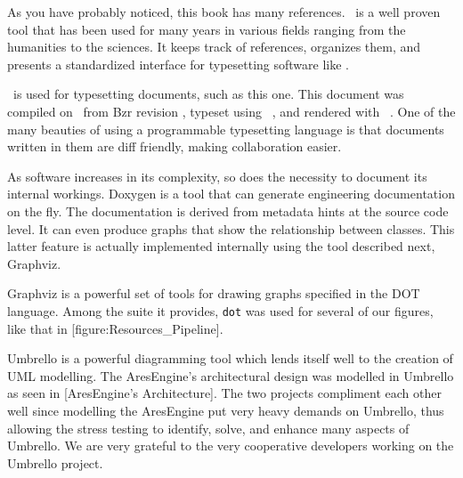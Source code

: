 

\startitemize[4]
\head {\em \BIBTEX}

As you have probably noticed, this book has many references. \BIBTEX\ is a well proven tool that has been used for many years in various fields ranging from the humanities to the sciences. It keeps track of references, organizes them, and presents a standardized interface for typesetting software like \CONTEXT.

\head {\em \CONTEXT}

\CONTEXT\ is used for typesetting documents, such as this one. This document was compiled on \currentdate\ from Bzr revision \BzrRevisionClickable, typeset using \CONTEXT\ \contextversion, and rendered with \texenginename\ \texengineversion. One of the many beauties of using a programmable typesetting language is that documents written in them are diff friendly, making collaboration easier.


As software increases in its complexity, so does the necessity to document its internal workings. Doxygen is a tool that can generate engineering documentation on the fly. The documentation is derived from metadata hints at the source code level. It can even produce graphs that show the relationship between classes. This latter feature is actually implemented internally using the tool described next, Graphviz.


Graphviz is a powerful set of tools for drawing graphs specified in the DOT language. Among the suite it provides, {\tt dot} was used for several of our figures, like that in [figure:Resources_Pipeline].


Umbrello is a powerful diagramming tool which lends itself well to the creation of UML modelling. The AresEngine's architectural design was modelled in Umbrello as seen in [AresEngine's Architecture]. The two projects compliment each other well since modelling the AresEngine put very heavy demands on Umbrello, thus allowing the stress testing to identify, solve, and enhance many aspects of Umbrello. We are very grateful to the very cooperative developers working on the Umbrello project.
\stopitemize


